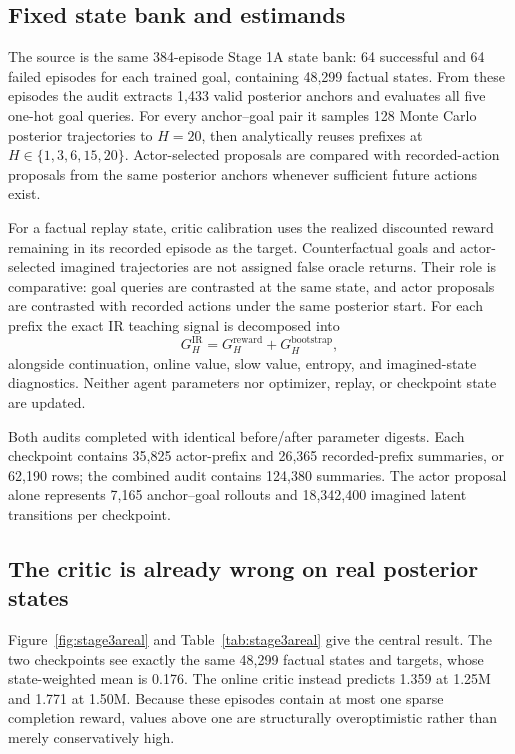 \documentclass[10pt]{article}
\begin{document}
\subsection{Fixed state bank and estimands}

The source is the same 384-episode Stage 1A state bank: 64 successful and 64 failed episodes for each trained goal, containing 48,299 factual states. From these episodes the audit extracts 1,433 valid posterior anchors and evaluates all five one-hot goal queries. For every anchor--goal pair it samples 128 Monte Carlo posterior trajectories to $H=20$, then analytically reuses prefixes at $H\in\{1,3,6,15,20\}$. Actor-selected proposals are compared with recorded-action proposals from the same posterior anchors whenever sufficient future actions exist.

For a factual replay state, critic calibration uses the realized discounted reward remaining in its recorded episode as the target. Counterfactual goals and actor-selected imagined trajectories are not assigned false oracle returns. Their role is comparative: goal queries are contrasted at the same state, and actor proposals are contrasted with recorded actions under the same posterior start. For each prefix the exact IR teaching signal is decomposed into
\begin{equation}
G_H^{\mathrm{IR}} = G_H^{\mathrm{reward}} + G_H^{\mathrm{bootstrap}},
\end{equation}
alongside continuation, online value, slow value, entropy, and imagined-state diagnostics. Neither agent parameters nor optimizer, replay, or checkpoint state are updated.

Both audits completed with identical before/after parameter digests. Each checkpoint contains 35,825 actor-prefix and 26,365 recorded-prefix summaries, or 62,190 rows; the combined audit contains 124,380 summaries. The actor proposal alone represents 7,165 anchor--goal rollouts and 18,342,400 imagined latent transitions per checkpoint.

\subsection{The critic is already wrong on real posterior states}

Figure~\ref{fig:stage3areal} and Table~\ref{tab:stage3areal} give the central result. The two checkpoints see exactly the same 48,299 factual states and targets, whose state-weighted mean is 0.176. The online critic instead predicts 1.359 at 1.25M and 1.771 at 1.50M. Because these episodes contain at most one sparse completion reward, values above one are structurally overoptimistic rather than merely conservatively high.
\end{document}
